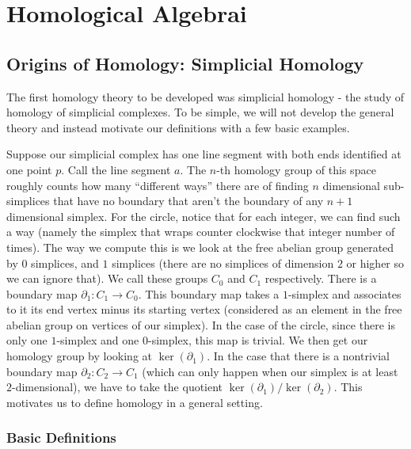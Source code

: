 \chapter{Homological Algebrai}
\section{Origins of Homology: Simplicial Homology}

The first homology theory
to be developed was simplicial homology - the study of homology of simplicial
complexes. To be simple, we will not develop the general theory and instead
motivate our definitions with a few basic examples.  

\begin{example} Suppose
our simplicial complex has one line segment with both ends identified at
one point $p$. Call the line segment $a$. The $n$-th homology group of this
space roughly counts how many ``different ways'' there are of finding $n$
dimensional sub-simplices that have no boundary that aren't the boundary of
any $n+1$ dimensional simplex. For the circle, notice that for each integer,
we can find such a way (namely the simplex that wraps counter clockwise that
integer number of times). The way we compute this is we look at the free abelian group generated by $0$ simplices, and $1$ simplices (there are no simplices of
dimension $2$ or higher so we can ignore that). We call these groups $C_0$ and
$C_1$ respectively. There is a boundary map $\partial_1: C_1\rightarrow C_0$.
This boundary map takes a $1$-simplex and associates to it its end vertex minus
its starting vertex (considered as an element in the free abelian group on
vertices of our simplex). In the case of the circle, since there is only one
$1$-simplex and one $0$-simplex, this map is trivial. We then get our homology
group by looking at $\ker(\partial_1)$. In the case that there is a nontrivial
boundary map $\partial_2: C_2\rightarrow C_1$ (which can only happen when our
simplex is at least $2$-dimensional), we have to take the quotient
$\ker(\partial_1)/\ker(\partial_2)$. This motivates us to define homology in a
general setting.
\end{example}
\subsection{Basic Definitions}

